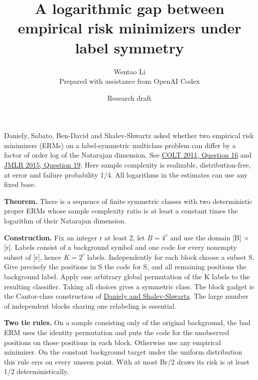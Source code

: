 \documentclass[11pt]{article}
\title{A logarithmic gap between empirical risk minimizers under label symmetry}
\author{Wentao Li\\{\small Prepared with assistance from OpenAI Codex}}
\date{Research draft}
\begin{document}
\maketitle
Daniely, Sabato, Ben-David and Shalev-Shwartz asked whether two empirical risk minimizers (ERMs) on a label-symmetric multiclass problem can differ by a factor of order log of the Natarajan dimension. See \href{https://proceedings.mlr.press/v19/daniely11a.html}{COLT 2011, Question 16} and \href{https://jmlr.org/papers/v16/daniely15a.html}{JMLR 2015, Question 19}. Here sample complexity is realizable, distribution-free, at error and failure probability 1/4. All logarithms in the estimates can use any fixed base.

\textbf{Theorem.} There is a sequence of finite symmetric classes with two deterministic proper ERMs whose sample complexity ratio is at least a constant times the logarithm of their Natarajan dimension.

\textbf{Construction.} Fix an integer r at least 2, let \(B=4^r\) and use the domain {[}B{]} × {[}r{]}. Labels consist of a background symbol and one code for every nonempty subset of {[}r{]}, hence \(K=2^r\) labels. Independently for each block choose a subset S. Give precisely the positions in S the code for S, and all remaining positions the background label. Apply one arbitrary global permutation of the K labels to the resulting classifier. Taking all choices gives a symmetric class. The block gadget is the Cantor-class construction of \href{https://proceedings.mlr.press/v35/daniely14b.html}{Daniely and Shalev-Shwartz}. The large number of independent blocks sharing one relabeling is essential.

\textbf{Two tie rules.} On a sample consisting only of the original background, the bad ERM uses the identity permutation and puts the code for the unobserved positions on those positions in each block. Otherwise use any empirical minimizer. On the constant background target under the uniform distribution this rule errs on every unseen point. With at most Br/2 draws its risk is at least 1/2 deterministically.
\end{document}
